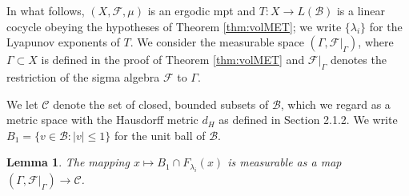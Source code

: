 \documentclass[11pt]{amsart}
\theoremstyle{theorem}
\newtheorem{lem}[thm]{Lemma}
\theoremstyle{definition}
\numberwithin{equation}{section}
\newcommand{\Fc}{\mathcal{F}}
\renewcommand{\l}{\lambda}
\newcommand{\Bc}{\mathcal{B}}
\begin{document}
\medskip

In what follows, $(X, \Fc, \mu)$ is an ergodic mpt and $T : X \to L(\Bc)$ is a linear cocycle obeying the hypotheses of Theorem \ref{thm:volMET};  we write $\{\l_i\}$ for the Lyapunov exponents of $T$. We consider the measurable space $(\Gamma, \Fc|_\Gamma)$, where $\Gamma \subset X$ is defined in the proof of Theorem \ref{thm:volMET} and $\Fc|_{\Gamma}$ denotes the restriction of the sigma algebra $\Fc$ to $\Gamma$.

We let $\mathscr C$ denote the set of closed, bounded subsets of $\Bc$, which we regard as a metric space with the Hausdorff metric $d_H$ as defined in Section 2.1.2. We write $B_1 = \{v \in \Bc : |v| \leq 1\}$ for the unit ball of $\Bc$.

\medskip

\begin{lem}\label{lem:measurabilitySubspace}
The mapping $x \mapsto B_1 \cap F_{\l_i}(x)$ is measurable as a map $(\Gamma, \Fc|_{\Gamma}) \to \mathscr C$.
\end{lem}
\end{document}
